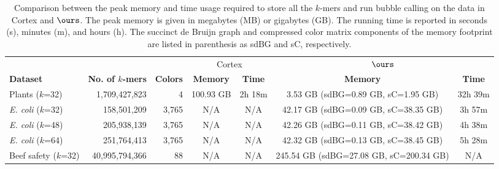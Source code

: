 \begin{table}
  \caption{Comparison between the peak memory and time usage required to store all the $k$-mers and run bubble calling on the data in {\sc Cortex} and $\ours$.
    The peak memory is given in megabytes (MB) or gigabytes (GB). The running time is reported in seconds (s), minutes (m), and hours (h).  The succinct de Bruijn graph and compressed color matrix components of the memory footprint are listed in parenthesis as sdBG and sC, respectively.}
 \label{tbl-cosmo}
 \scriptsize
 \setlength\tabcolsep{2.2pt}
  \centering
  \begin{tabularx}{\textwidth}{@{}Xrrcccc@{}}
   	\toprule
	\multicolumn{1}{l}{}
   	& \multicolumn{1}{r}{}	
	& \multicolumn{1}{r}{} 
	& \multicolumn{2}{c}{{\sc Cortex}} 
	& \multicolumn{2}{c}{$\ours$}  \\
	\cmidrule(lr){4-5}\cmidrule(l){6-7}
        {\bf Dataset} & {\bf\boldmath No. of $k$-mers} & {\bf Colors} & {\bf Memory} & {\bf Time} & {\bf Memory} & {\bf Time} \\
	\midrule
	Plants	($k$=32)				& 1,709,427,823 	& 4 	& 100.93 GB 	& 2h 18m	& 3.53 GB (sdBG=0.89 GB, sC=1.95 GB) 	& 32h 39m \\
     \emph{E. coli}  ($k$=32)         & 158,501,209       & 3,765 & N/A        & N/A      &  42.17 GB (sdBG=0.09 GB, sC=38.35 GB)     & 3h 57m  \\
     \emph{E. coli}  ($k$=48)         & 205,938,139       & 3,765 & N/A        & N/A      &  42.26 GB (sdBG=0.11 GB, sC=38.42 GB)     & 4h 38m  \\
     \emph{E. coli}  ($k$=64)         & 251,764,413       & 3,765 & N/A        & N/A      &  42.32 GB (sdBG=0.13 GB, sC=38.45 GB)     & 5h 28m  \\
    Beef safety ($k$=32)                            & 40,995,794,366    & 88    & N/A        & N/A   & 245.54 GB (sdBG=27.08 GB, sC=200.34 GB)     & N/A \\
 	\bottomrule
	\end{tabularx}
\end{table}


\subsection{}

